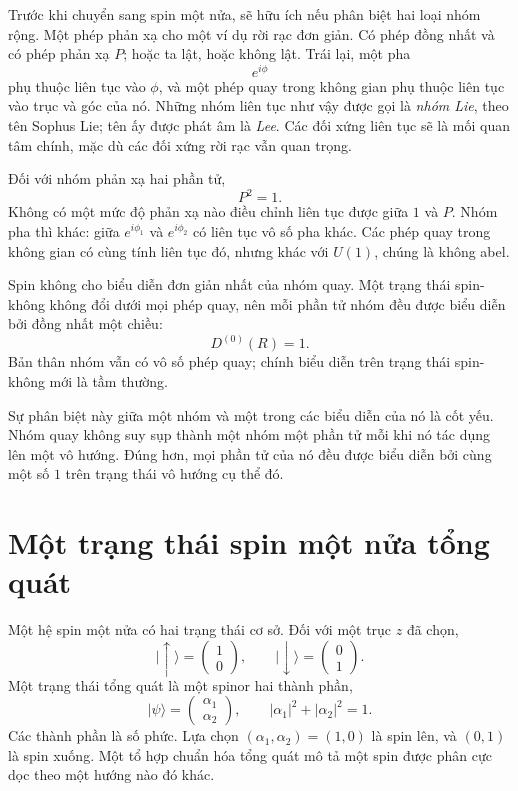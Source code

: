 Trước khi chuyển sang spin một nửa, sẽ hữu ích nếu phân biệt hai loại nhóm rộng. Một phép phản xạ cho một ví dụ rời rạc đơn giản. Có phép đồng nhất và có phép phản xạ \(P\); hoặc ta lật, hoặc không lật. Trái lại, một pha
\begin{equation}
e^{i\phi}
\end{equation}
phụ thuộc liên tục vào \(\phi\), và một phép quay trong không gian phụ thuộc liên tục vào trục và góc của nó. Những nhóm liên tục như vậy được gọi là \emph{nhóm Lie}, theo tên Sophus Lie; tên ấy được phát âm là \emph{Lee}. Các đối xứng liên tục sẽ là mối quan tâm chính, mặc dù các đối xứng rời rạc vẫn quan trọng.

Đối với nhóm phản xạ hai phần tử,
\begin{equation}
P^2=1.
\end{equation}
Không có một mức độ phản xạ nào điều chỉnh liên tục được giữa \(1\) và \(P\). Nhóm pha thì khác: giữa \(e^{i\phi_1}\) và \(e^{i\phi_2}\) có liên tục vô số pha khác. Các phép quay trong không gian có cùng tính liên tục đó, nhưng khác với \(U(1)\), chúng là không abel.

Spin không cho biểu diễn đơn giản nhất của nhóm quay. Một trạng thái spin-không không đổi dưới mọi phép quay, nên mỗi phần tử nhóm đều được biểu diễn bởi đồng nhất một chiều:
\begin{equation}
D^{(0)}(R)=1.
\end{equation}
Bản thân nhóm vẫn có vô số phép quay; chính biểu diễn trên trạng thái spin-không mới là tầm thường.

Sự phân biệt này giữa một nhóm và một trong các biểu diễn của nó là cốt yếu. Nhóm quay không suy sụp thành một nhóm một phần tử mỗi khi nó tác dụng lên một vô hướng. Đúng hơn, mọi phần tử của nó đều được biểu diễn bởi cùng một số \(1\) trên trạng thái vô hướng cụ thể đó.

\section{Một trạng thái spin một nửa tổng quát}

Một hệ spin một nửa có hai trạng thái cơ sở. Đối với một trục \(z\) đã chọn,
\begin{equation}
\lvert\uparrow\rangle=
\begin{pmatrix}1\\0\end{pmatrix},
\qquad
\lvert\downarrow\rangle=
\begin{pmatrix}0\\1\end{pmatrix}.
\end{equation}
Một trạng thái tổng quát là một spinor hai thành phần,
\begin{equation}
\lvert\psi\rangle=
\begin{pmatrix}\alpha_1\\\alpha_2\end{pmatrix},
\qquad
|\alpha_1|^2+|\alpha_2|^2=1.
\label{eq:l3-spinor}
\end{equation}
Các thành phần là số phức. Lựa chọn \((\alpha_1,\alpha_2)=(1,0)\) là spin lên, và \((0,1)\) là spin xuống. Một tổ hợp chuẩn hóa tổng quát mô tả một spin được phân cực dọc theo một hướng nào đó khác.

